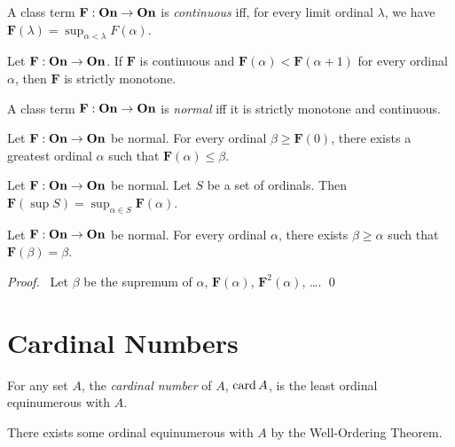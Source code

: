 \begin{definition}
    A class term $\mathbf{F} : \mathbf{On} \rightarrow \mathbf{On}$ is
    \emph{continuous} iff, for every limit ordinal $\lambda$,
    we have $\mathbf{F}(\lambda) = \sup_{\alpha < \lambda} F(\alpha)$.
\end{definition}

\begin{theorem}
    Let $\mathbf{F} : \mathbf{On} \rightarrow \mathbf{On}$. If $\mathbf{F}$ is continuous
    and $\mathbf{F}(\alpha) < \mathbf{F}(\alpha + 1)$ for every ordinal $\alpha$,
    then $\mathbf{F}$ is strictly monotone.
\end{theorem}

\begin{definition}
    A class term $\mathbf{F} : \mathbf{On} \rightarrow \mathbf{On}$ is \emph{normal}
    iff it is strictly monotone and continuous.
\end{definition}

\begin{theorem}
    Let $\mathbf{F} : \mathbf{On} \rightarrow \mathbf{On}$ be normal. For every
    ordinal $\beta \geq \mathbf{F}(0)$, there exists a greatest
    ordinal $\alpha$ such that $\mathbf{F}(\alpha) \leq \beta$.
\end{theorem}

\begin{theorem}
    Let $\mathbf{F} : \mathbf{On} \rightarrow \mathbf{On}$ be normal.
    Let $S$ be a set of ordinals. Then $\mathbf{F}(\sup S) = \sup_{\alpha \in S} \mathbf{F}(\alpha)$.
\end{theorem}

\begin{theorem}
    Let $\mathbf{F} : \mathbf{On} \rightarrow \mathbf{On}$ be normal.
    For every ordinal $\alpha$, there exists $\beta \geq \alpha$
    such that $\mathbf{F}(\beta) = \beta$.
\end{theorem}

\begin{proof}
    \pf\ Let $\beta$ be the supremum of $\alpha$, $\mathbf{F}(\alpha)$, $\mathbf{F}^2(\alpha)$, \ldots. \qed
\end{proof}

\section{Cardinal Numbers}

\begin{definition}
    For any set $A$, the \emph{cardinal number} of $A$, $\operatorname{card} A$, is the least ordinal
    equinumerous with $A$.

    There exists some ordinal equinumerous with $A$ by the Well-Ordering Theorem.
\end{definition}

